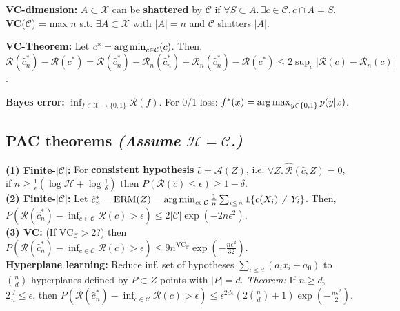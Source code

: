 \textbf{VC-dimension:} $A\subset\mathcal{X}$ can be \textbf{shattered} by $\mathcal{C}$ if $\forall S\subset A.\, \exists c\in\mathcal{C}.\, c\cap A = S$.
\textbf{VC}($\mathcal{C}$) = max $n$ s.t. $\exists A\subset\mathcal{X}$ with $|A|=n$ and $\mathcal{C}$ shatters $|A|$. 

\textbf{VC-Theorem:} Let $c^* = \operatorname*{arg\,min}_{c\in\mathcal{C}}(c)$. Then, $\mathcal{R}(\hat{c}^*_n) - \mathcal{R}(c^*)  = \mathcal{R}(\hat{c}^*_n) - \mathcal{R}_n(\hat{c}^*_n) + \mathcal{R}_n(\hat{c}^*_n) - \mathcal{R}(c^*) \leq 2\sup_c|\mathcal{R}(c)-\mathcal{R}_n(c)|$.

\textbf{Bayes error:} $\inf_{f\in\mathcal{X}\to\{0,1\}}\mathcal{R}(f)$. For 0/1-loss: $f^*(x) = \operatorname*{arg\,max}_{y\in\{0,1\}}p(y|x)$.

\subsection*{PAC theorems \normalfont \emph{(Assume $\mathcal{H} = \mathcal{C}$.)}}
\textbf{(1) Finite-$|\mathcal{C}|$:} For \textbf{consistent hypothesis} $\hat{c}=\mathcal{A}(Z)$, i.e. $\forall Z.\,\mathcal{\hat{R}}(\hat{c},Z)=0$, if $n\geq \frac{1}{\epsilon}(\log\mathcal{H}+\log\frac{1}{\delta})$ then $P(\mathcal{R}(\hat{c}) \leq \epsilon) \geq 1-\delta$.\\
\textbf{(2) Finite-$|\mathcal{C}|$:} Let $\hat{c}^*_n = \mathrm{ERM}(Z) = \operatorname*{arg\,min}_{c\in\mathcal{C}}\frac{1}{n}\sum_{i\leq n}\mathbf{1}\{c(X_i)\neq Y_i\}$. Then, $P(\mathcal{R}(\hat{c}^*_n) - \inf_{c\in\mathcal{C}}\mathcal{R}(c) > \epsilon) \leq 2|\mathcal{C}|\exp(-2n\epsilon^2)$.\\
\textbf{(3) VC:} (If $\mathrm{VC}_\mathcal{C}>2$?) then 
$P(\mathcal{R}(\hat{c}^*_n) - \inf_{c\in\mathcal{C}}\mathcal{R}(c) > \epsilon) \leq 9n^{\mathrm{VC}_\mathcal{C}}\exp(-\frac{n\epsilon^2}{32})$.\\
\textbf{Hyperplane learning:} Reduce inf. set of hypotheses $\sum_{i\leq d}(a_i x_i + a_0)$ to $\binom{n}{d}$ hyperplanes defined by $P\subset Z$ points with $|P| = d$. \emph{Theorem:} If $n\geq d$, $2\frac{d}{n}\leq\epsilon$, then $P(\mathcal{R}(\hat{c}^*_n)-\inf_{c\in\mathcal{C}}\mathcal{R}(c)>\epsilon) \leq \epsilon^{2d\epsilon}(2\binom{n}{d}+1)\exp(-\frac{n\epsilon^2}{2})$.

